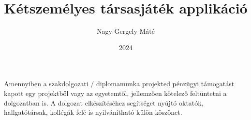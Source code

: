 \documentclass[
]{elteikthesis}[2024/04/26]
\title{Kétszemélyes társasjáték applikáció} %
\date{2024} %
\author{Nagy Gergely Máté}
\affiliation{egyetemi adjunktus} %
\begin{document}


\maketitle
%

\tableofcontents
\cleardoublepage


\cleardoublepage


\cleardoublepage


\cleardoublepage


\cleardoublepage

\chapter*{\acklabel}
Amennyiben a szakdolgozati / diplomamunka projekted pénzügyi támogatást kapott egy projektből vagy az egyetemtől, jellemzően kötelező feltüntetni a dolgozatban is. A dolgozat elkészítéséhez segítséget nyújtó oktatók, hallgatótársak, kollégák felé is nyilvánítható külön köszönet.

\appendix

\cleardoublepage

{}
\printbibliography[title=\biblabel]
\cleardoublepage

{}
\listoffigures
\cleardoublepage

{}
\listoftables
\cleardoublepage

{}
\listofalgorithms
\cleardoublepage

{}
\lstlistoflistings
\cleardoublepage

\end{document}
